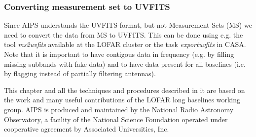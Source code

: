 \documentclass[graybox]{svmult}
\begin{document}
\subsubsection{Converting measurement set to UVFITS}
Since AIPS understands the UVFITS-format, but not Measurement Sets (MS)
we need to convert the data from MS to UVFITS. This can be done using e.g.
the tool \emph{ms2uvfits} available at the LOFAR cluster or the task \emph{exportuvfits} in CASA.
Note that it is important to have contigous data in frequency (e.g. by filling 
missing subbands with fake data) and to have data present for all baselines (i.e.
by flagging instead of partially filtering antennas). 



\begin{acknowledgement}
This chapter and all the techniques and procedures described in it are based on
the work and many useful contributions of the LOFAR long baselines working
group. AIPS is produced and maintained by the National Radio Astronomy
Observatory, a facility of the National Science Foundation operated under
cooperative agreement by Associated Universities, Inc.

\end{acknowledgement}

%



\end{document}
